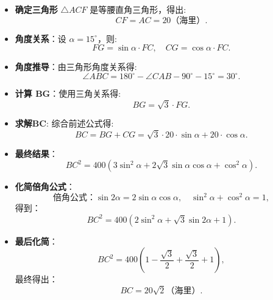 \documentclass[answers]{exam}
\begin{document}
\begin{questions}
\begin{solution}

		\begin{itemize}
			\item \textbf{确定三角形} $\triangle{ACF}$ 是等腰直角三角形，得出:
			      \[
				      CF = AC = 20 \text{（海里）}.
			      \]
			\item \textbf{角度关系}：设 $\alpha = 15^\circ$，则:
			      \[
				      FG = \sin{\alpha} \cdot FC, \quad CG = \cos{\alpha} \cdot FC.
			      \]
			\item \textbf{角度推导}：由三角形角度关系得:
			      \[
				      \angle ABC = 180^\circ - \angle CAB - 90^\circ - 15^\circ = 30^\circ.
			      \]
			\item \textbf{计算 BG}：使用三角关系得:
			      \[
				      BG = \sqrt{3} \cdot FG.
			      \]
			\item \textbf{求解BC}: 综合前述公式得:
			      \[
				      BC = BG + CG = \sqrt{3} \cdot 20 \cdot \sin{\alpha} + 20 \cdot \cos{\alpha}.
			      \]
			\item \textbf{最终结果}：
			      \[
				      BC^2 = 400 \left( 3 \sin^2{\alpha} + 2\sqrt{3} \sin{\alpha} \cos{\alpha} + \cos^2{\alpha} \right).
			      \]
			\item \textbf{化简倍角公式}：
			      \[
				      \text{倍角公式：} \sin{2\alpha} = 2 \sin{\alpha} \cos{\alpha}, \quad \sin^2{\alpha} + \cos^2{\alpha} = 1,
			      \]
			      得到：
			      \[
				      BC^2 = 400 \left( 2 \sin^2{\alpha} + \sqrt{3} \sin{2\alpha} + 1 \right).
			      \]
			\item \textbf{最后化简}：
			      \[
				      BC^2 = 400 \left( 1 - \frac{\sqrt{3}}{2} + \frac{\sqrt{3}}{2} + 1 \right),
			      \]
			      最终得出：
			      \[
				      BC = 20\sqrt{2} \text{（海里）}.
			      \]
		\end{itemize}
	\end{solution}


\end{questions}
\end{document}
